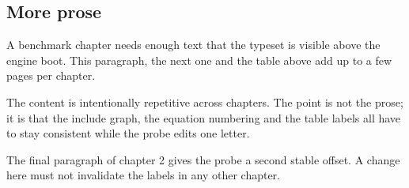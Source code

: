 \subsection{More prose}
A benchmark chapter needs enough text that the type\-set is visible above the
engine boot. This paragraph, the next one and the table above add up to a few
pages per chapter.

The content is intentionally repetitive across chapters. The point is not the
prose; it is that the include graph, the equation numbering and the table
labels all have to stay consistent while the probe edits one letter.

The final paragraph of chapter 2 gives the probe a second stable offset. A
change here must not invalidate the labels in any other chapter.
